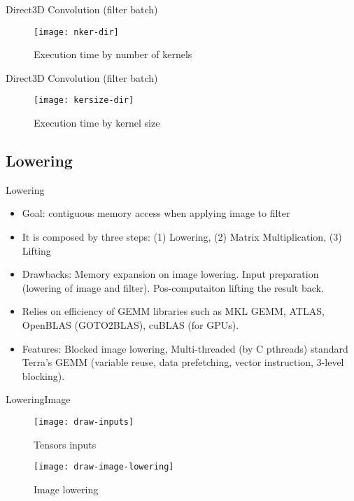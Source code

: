 \begin{frame}{Direct}{3D Convolution (filter batch)}
\begin{figure}[ht] \label{ fig7} 
      \texttt{[image: nker-dir]}
    \caption{Execution time by number of kernels} 
\end{figure}
\end{frame}

\begin{frame}{Direct}{3D Convolution (filter batch)}
\begin{figure}[ht] \label{ fig7} 
     \texttt{[image: kersize-dir]}
    \caption{Execution time by kernel size} 
\end{figure}
\end{frame}


\subsection{Lowering}

\begin{frame}{Lowering}
  \begin{itemize}
  \item {
    Goal: contiguous memory access when applying image to filter
  }
  \item {
   It is composed by three steps: (1) Lowering, (2) Matrix Multiplication, (3) Lifting
  }
  \item {
   Drawbacks: Memory expansion on image lowering. Input preparation (lowering of image and filter). Pos-computaiton lifting the result back. 
  }
  \item {
   Relies on efficiency of GEMM libraries such as MKL  GEMM, ATLAS, OpenBLAS (GOTO2BLAS), cuBLAS (for GPUs). 
  }
  \item {   
    Features: Blocked image lowering, Multi-threaded (by C pthreads) standard Terra's GEMM (variable reuse, data prefetching, vector instruction, 3-level blocking).
  }
  \end{itemize}
\end{frame}

\begin{frame}{Lowering}{Image}
\begin{figure}[ht] \label{ fig7} 
  \begin{minipage}[b]{0.5\linewidth}
      \texttt{[image: draw-inputs]}
    \caption{Tensors inputs} 
  \end{minipage} 

  \begin{minipage}[b]{0.5\linewidth}
     \texttt{[image: draw-image-lowering]}
    \caption{Image lowering} 
  \end{minipage}
  \hfill
\end{figure}
\end{frame}

